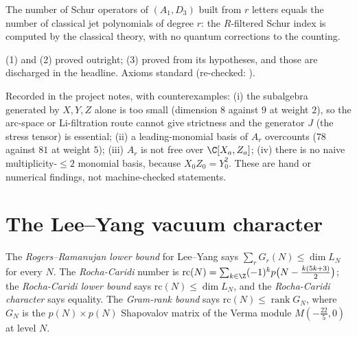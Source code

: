 \begin{physics}
The number of Schur operators of $(A_1,D_3)$ built from $r$ letters equals the number of classical jet polynomials of degree $r$: the $R$-filtered
Schur index is computed by the classical theory, with no quantum corrections to the counting.
\end{physics}

\begin{status}
(1) and (2) proved outright; (3) proved from its hypotheses, and those are discharged in the headline. Axioms standard (re-checked:
).
\end{status}

\begin{warning}[title={Dead ends for strictness}]
Recorded in the project notes, with counterexamples: (i) the subalgebra generated by $X,Y,Z$ alone is too small (dimension $8$ against $9$ at weight $2$), so
the arc-space or Li-filtration route cannot give strictness and the generator $J$ (the stress tensor) is essential; (ii) a leading-monomial basis of $A_r$
overcounts ($78$ against $81$ at weight $5$); (iii) $A_r$ is not free over $\C[X_a,Z_a]$; (iv) there is no naive multiplicity-$\le2$ monomial basis, because
$X_0Z_0=Y_0^2$. These are hand or numerical findings, not machine-checked statements.
\end{warning}

\section{The Lee--Yang vacuum character}\label{l28:sec:character}

\begin{definition}\label{l28:def:rr}
The \emph{Rogers--Ramanujan lower bound} for Lee--Yang says $\sum_rG_r(N)\le\dim L_N$ for every $N$. The \emph{Rocha-Caridi} number is
$\mathrm{rc}(N)=\sum_{k\in\Z}(-1)^kp\bigl(N-\tfrac{k(5k+3)}2\bigr)$; the \emph{Rocha-Caridi lower bound} says $\mathrm{rc}(N)\le\dim L_N$, and the
\emph{Rocha-Caridi character} says equality. The \emph{Gram-rank bound} says $\mathrm{rc}(N)\le\operatorname{rank}G_N$, where $G_N$ is the $p(N)\times p(N)$
Shapovalov matrix of the Verma module $M(-\tfrac{22}5,0)$ at level $N$.
\end{definition}

